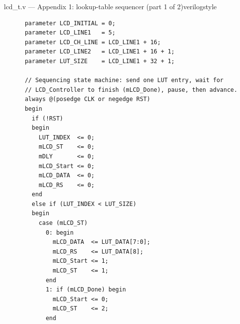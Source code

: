 \begin{procedure}
\begin{codepanel}{lcd\_t.v --- Appendix 1: lookup-table sequencer (part 1 of 2)}{verilogstyle}
\begin{lstlisting}
      parameter LCD_INITIAL = 0;
      parameter LCD_LINE1   = 5;
      parameter LCD_CH_LINE = LCD_LINE1 + 16;
      parameter LCD_LINE2   = LCD_LINE1 + 16 + 1;
      parameter LUT_SIZE    = LCD_LINE1 + 32 + 1;

      // Sequencing state machine: send one LUT entry, wait for
      // LCD_Controller to finish (mLCD_Done), pause, then advance.
      always @(posedge CLK or negedge RST)
      begin
        if (!RST)
        begin
          LUT_INDEX  <= 0;
          mLCD_ST    <= 0;
          mDLY       <= 0;
          mLCD_Start <= 0;
          mLCD_DATA  <= 0;
          mLCD_RS    <= 0;
        end
        else if (LUT_INDEX < LUT_SIZE)
        begin
          case (mLCD_ST)
            0: begin
              mLCD_DATA  <= LUT_DATA[7:0];
              mLCD_RS    <= LUT_DATA[8];
              mLCD_Start <= 1;
              mLCD_ST    <= 1;
            end
            1: if (mLCD_Done) begin
              mLCD_Start <= 0;
              mLCD_ST    <= 2;
            end
    \end{lstlisting}
    \end{codepanel}


\end{procedure}
